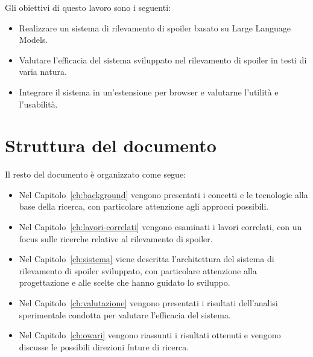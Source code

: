 Gli obiettivi di questo lavoro sono i seguenti:

\begin{itemize}
      \item Realizzare un sistema di rilevamento di spoiler
            basato su Large Language Models.
      \item Valutare l'efficacia del sistema sviluppato nel
            rilevamento di spoiler in testi di varia natura.
      \item Integrare il sistema in un'estensione per browser
            e valutarne l'utilità e l'usabilità.
\end{itemize}

\section{Struttura del documento}
\label{sec:struttura-tesi}

Il resto del documento è organizzato come segue:

\begin{itemize}
      \item Nel Capitolo~\ref{ch:background} vengono
            presentati i concetti e le tecnologie alla base
            della ricerca, con particolare attenzione agli approcci
            possibili.
      \item Nel Capitolo~\ref{ch:lavori-correlati} vengono
            esaminati i lavori correlati, con un focus sulle
            ricerche relative al rilevamento di spoiler.
      \item Nel Capitolo~\ref{ch:sistema} viene descritta
            l'architettura del sistema di rilevamento di spoiler
            sviluppato, con particolare attenzione alla
            progettazione e alle scelte che hanno guidato lo sviluppo.
      \item Nel Capitolo~\ref{ch:valutazione} vengono
            presentati i risultati dell'analisi sperimentale
            condotta per valutare l'efficacia del sistema.
      \item Nel Capitolo~\ref{ch:owari} vengono
            riassunti i risultati ottenuti e vengono discusse
            le possibili direzioni future di ricerca.
\end{itemize}

